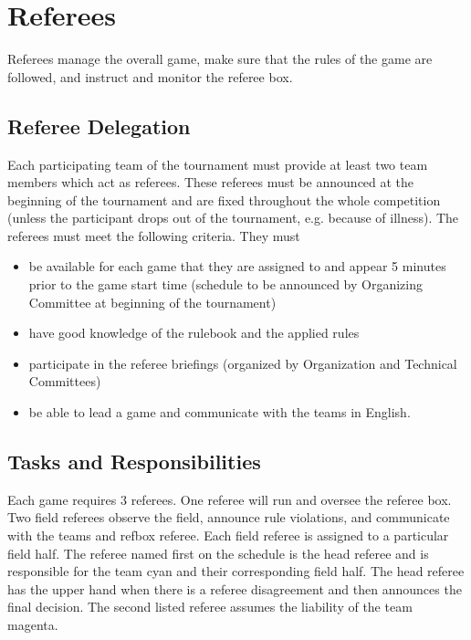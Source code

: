 \documentclass[12pt,twoside]{article}
\begin{document}

\section{Referees}
Referees manage the overall game, make sure that the rules of the game
are followed, and instruct and monitor the referee box.

\subsection{Referee Delegation}
Each participating team of the tournament must provide at least two
team members which act as referees. These referees must be announced
at the beginning of the tournament and are fixed throughout the whole
competition (unless the participant drops out of the tournament,
e.g. because of illness). The referees must meet the following
criteria. They must

\begin{itemize}
\item be available for each game that they are assigned to and appear
  5 minutes prior to the game start time (schedule to be announced by
  Organizing Committee at beginning of the tournament)
\item have good knowledge of the rulebook and the applied rules
\item participate in the referee briefings (organized by Organization
  and Technical Committees)
\item be able to lead a game and communicate with the teams in
  English.
\end{itemize}

\subsection{Tasks and Responsibilities}
Each game requires 3 referees. One referee will run and oversee the
referee box. Two field referees observe the field, announce rule
violations, and communicate with the teams and refbox referee. Each
field referee is assigned to a particular field half. The referee
named first on the schedule is the head referee and is responsible for the 
team cyan and their corresponding field half. The head referee has
the upper hand when there is a referee disagreement and then announces
the final decision. The second listed referee assumes the liability of the 
team magenta.
\end{document}
